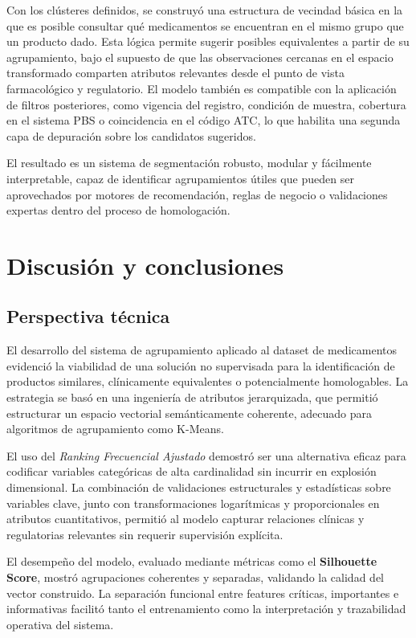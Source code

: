 \documentclass[conference]{IEEEtran}
\begin{document}
Con los clústeres definidos, se construyó una estructura de vecindad básica en la que es posible consultar qué medicamentos se encuentran en el mismo grupo que un producto dado. Esta lógica permite sugerir posibles equivalentes a partir de su agrupamiento, bajo el supuesto de que las observaciones cercanas en el espacio transformado comparten atributos relevantes desde el punto de vista farmacológico y regulatorio. El modelo también es compatible con la aplicación de filtros posteriores, como vigencia del registro, condición de muestra, cobertura en el sistema PBS o coincidencia en el código ATC, lo que habilita una segunda capa de depuración sobre los candidatos sugeridos.

El resultado es un sistema de segmentación robusto, modular y fácilmente interpretable, capaz de identificar agrupamientos útiles que pueden ser aprovechados por motores de recomendación, reglas de negocio o validaciones expertas dentro del proceso de homologación.

\section{Discusión y conclusiones}

\subsection{Perspectiva técnica}

El desarrollo del sistema de agrupamiento aplicado al dataset de medicamentos evidenció la viabilidad de una solución no supervisada para la identificación de productos similares, clínicamente equivalentes o potencialmente homologables. La estrategia se basó en una ingeniería de atributos jerarquizada, que permitió estructurar un espacio vectorial semánticamente coherente, adecuado para algoritmos de agrupamiento como K-Means.

El uso del \textit{Ranking Frecuencial Ajustado} demostró ser una alternativa eficaz para codificar variables categóricas de alta cardinalidad sin incurrir en explosión dimensional. La combinación de validaciones estructurales y estadísticas sobre variables clave, junto con transformaciones logarítmicas y proporcionales en atributos cuantitativos, permitió al modelo capturar relaciones clínicas y regulatorias relevantes sin requerir supervisión explícita.

El desempeño del modelo, evaluado mediante métricas como el \textbf{Silhouette Score}, mostró agrupaciones coherentes y separadas, validando la calidad del vector construido. La separación funcional entre features críticas, importantes e informativas facilitó tanto el entrenamiento como la interpretación y trazabilidad operativa del sistema.
\end{document}
